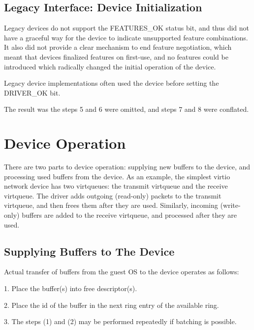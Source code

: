 \subsection{Legacy Interface: Device Initialization}\label{sec:General Initialization And Device Operation / Device Initialization / Legacy Interface: Device Initialization}
Legacy devices do not support the FEATURES_OK status bit, and thus did
not have a graceful way for the device to indicate unsupported feature
combinations.  It also did not provide a clear mechanism to end
feature negotiation, which meant that devices finalized features on
first-use, and no features could be introduced which radically changed
the initial operation of the device.

Legacy device implementations often used the device before setting the
DRIVER_OK bit.

The result was the steps 5 and 6 were omitted, and steps 7 and 8
were conflated.

\section{Device Operation}\label{sec:General Initialization And Device Operation / Device Operation}

There are two parts to device operation: supplying new buffers to
the device, and processing used buffers from the device. As an
example, the simplest virtio network device has two virtqueues: the
transmit virtqueue and the receive virtqueue. The driver adds
outgoing (read-only) packets to the transmit virtqueue, and then
frees them after they are used. Similarly, incoming (write-only)
buffers are added to the receive virtqueue, and processed after
they are used.

\subsection{Supplying Buffers to The Device}\label{sec:General Initialization And Device Operation / Device Operation / Supplying Buffers to The Device}

Actual transfer of buffers from the guest OS to the device
operates as follows:

1. Place the buffer(s) into free descriptor(s).

2. Place the id of the buffer in the next ring entry of the
  available ring.

3. The steps (1) and (2) may be performed repeatedly if batching
  is possible.

